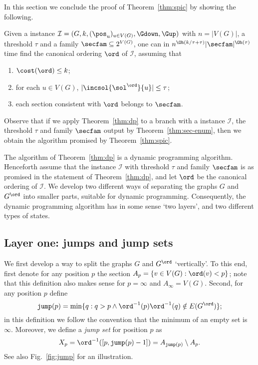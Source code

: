 \providecommand{\jump}[1]{\mathtt{jump}(#1)}
\providecommand{\jumpset}[1]{X_{#1}}
\providecommand{\secp}[1]{A_{#1}}
\providecommand{\jumpfam}{\mathcal{J}}
\providecommand{\chainfam}{\mathcal{C}}

In this section we conclude the proof of Theorem~\ref{thm:spic}
by showing the following.
\begin{theorem}\label{thm:dp}
Given a \spic{} instance $\mathcal{I} = (G,k,(\pos_u)_{u \in V(G)},\Gdown,\Gup)$ with $n = |V(G)|$,
 a threshold $\tau$ and a family $\secfam \subseteq 2^{V(G)}$,
one can in $n^{\Oh(k/\tau+\tau)} |\secfam|^{\Oh(\tau)}$ time find the canonical ordering $\ord$ of $\mathcal{I}$, assuming that
\begin{enumerate}
\item $\cost(\ord) \leq k$;
\item for each $u \in V(G)$, $|\incsol{\sol^\ord}{u}| \leq \tau$;
\item each section consistent with $\ord$ belongs to $\secfam$.
\end{enumerate}
\end{theorem}
Observe that if we apply Theorem~\ref{thm:dp} to a branch with a \spic{} instance $\mathcal{I}$,
the threshold $\tau$ and family $\secfam$ output by Theorem~\ref{thm:sec-enum},
then we obtain the algorithm promised by Theorem~\ref{thm:spic}.

The algorithm of Theorem~\ref{thm:dp} is a dynamic programming algorithm.
Henceforth assume that the instance $\mathcal{I}$ with threshold $\tau$ and family $\secfam$
is as promised in the statement of Theorem~\ref{thm:dp}, and let $\ord$ be the canonical ordering of $\mathcal{I}$.
We develop two different ways of separating the graphs $G$ and $G^\ord$ into smaller parts,
suitable for dynamic programming. Consequently, the dynamic programming algorithm
has in some sense `two layers', and two different types of states.

\subsection{Layer one: jumps and jump sets}

We first develop a way to split the graphs $G$ and $G^\ord$ `vertically'.
To this end, first denote for any position $p$
the section $\secp{p} = \{v \in V(G): \ord(v) < p\}$; note that this definition also makes sense
for $p = \infty$ and $\secp{\infty} = V(G)$.
Second, for any position $p$ define
$$\jump{p} = \min\{q: q > p \wedge \ord^{-1}(p)\ord^{-1}(q) \notin E(G^\ord)\};$$
in this definition we follow the convention that the minimum of an empty set is $\infty$. Moreover, we define a \emph{jump set} for position $p$ as
$$\jumpset{p} = \ord^{-1}([p,\jump{p}-1]) = \secp{\jump{p}} \setminus \secp{p}.$$
See also Fig.~\ref{fig:jump} for an illustration.

